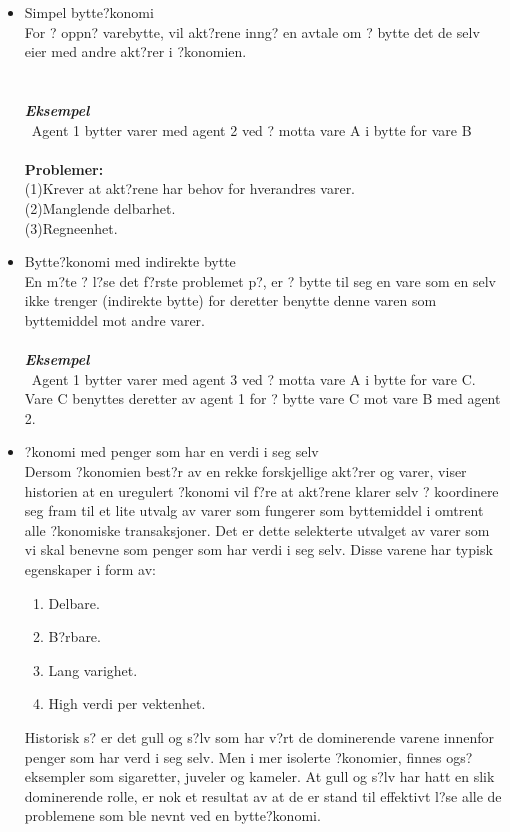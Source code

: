 \documentclass[a4paper,notitlepage]{article}
\begin{document}
\begin{itemize}
\item Simpel bytte?konomi\\
For ? oppn? varebytte, vil akt?rene inng? en avtale om ? bytte det de selv eier med andre akt?rer i ?konomien.\\
\noindent\textbf{\emph{\\ \\ Eksempel}}\\\
Agent 1 bytter varer med agent 2 ved ? motta vare A i bytte for vare B\\
\noindent\textbf{\\ Problemer:}\\
(1)Krever at akt?rene har behov for hverandres varer. \\
(2)Manglende delbarhet. \\
(3)Regneenhet.
\item Bytte?konomi med indirekte bytte\\
En m?te ? l?se det f?rste problemet p?, er ? bytte til seg en vare som en selv ikke trenger (indirekte bytte) for deretter benytte denne varen som byttemiddel mot andre varer.\\
\noindent\textbf{\emph{\\ Eksempel}}\\\
Agent 1 bytter varer med agent 3 ved ? motta vare A i bytte for vare C. Vare C benyttes deretter av agent 1 for ? bytte vare C mot vare B med agent 2.
\item ?konomi med penger som har en verdi i seg selv\\
Dersom ?konomien best?r av en rekke forskjellige akt?rer og varer, viser historien at en uregulert ?konomi vil f?re at akt?rene klarer selv ? koordinere seg fram til et lite utvalg av varer som fungerer som byttemiddel i omtrent alle ?konomiske transaksjoner. Det er dette selekterte utvalget av varer som vi skal benevne som penger som har verdi i seg selv. Disse varene har typisk egenskaper i form av:
\begin{enumerate}
\item Delbare.
\item B?rbare.
\item Lang varighet.
\item High verdi per vektenhet.
\end{enumerate}
Historisk s? er det gull og s?lv som har v?rt de dominerende varene innenfor penger som har verd i seg selv. Men i mer isolerte ?konomier, finnes ogs? eksempler som sigaretter, juveler og kameler. At gull og s?lv har hatt en slik dominerende rolle, er nok et resultat av at de er stand til effektivt l?se alle de problemene som ble nevnt ved en bytte?konomi.

\end{itemize}
\end{document}
